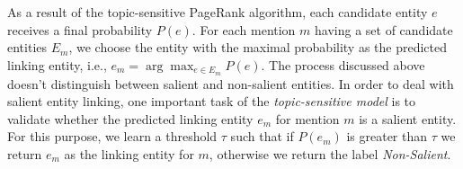 As a result of the topic-sensitive PageRank algorithm, each candidate entity $e$ receives a final probability $P(e)$. 
For each mention $m$ having a set of candidate entities $E_m$, we choose the entity with the maximal probability as the predicted linking entity, i.e., $e_{m} = \arg\max_{e\in E_m} P(e)$. The process discussed above doesn't distinguish between salient and non-salient entities. In order to deal with salient entity linking, one important task of the \emph{topic-sensitive model} is to validate whether the predicted linking entity $e_{m}$ for mention $m$ is a salient entity. For this purpose, we learn a threshold $\tau$ such that if $P(e_m)$ is greater than $\tau$ we return $e_m$ as the linking entity for $m$, otherwise we return the label \emph{Non-Salient}.




